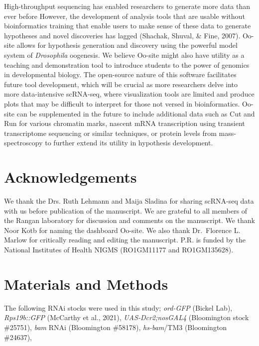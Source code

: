 \documentclass[12pt,oneside]{reedthesis}
\begin{document}
High-throughput sequencing has enabled researchers to generate more data
than ever before However, the development of analysis tools that are
usable without bioinformatics training that enable users to make sense
of these data to generate hypotheses and novel discoveries has lagged
(Shachak, Shuval, \& Fine, 2007). Oo-site allows for
hypothesis generation and discovery using the powerful model system of
\emph{Drosophila} oogenesis. We believe Oo-site might also have utility as a
teaching and demonstration tool to introduce students to the power of
genomics in developmental biology. The open-source nature of this
software facilitates future tool development, which will be crucial as
more researchers delve into more data-intensive scRNA-seq, where
visualization tools are limited and produce plots that may be difficult
to interpret for those not versed in bioinformatics. Oo-site can be
supplemented in the future to include additional data such as Cut and
Run for various chromatin marks, nascent mRNA transcription using
transient transcriptome sequencing or similar techniques, or protein
levels from mass-spectroscopy to further extend its utility in
hypothesis development.

\hypertarget{acknowledgements}{%
\section{Acknowledgements}\label{acknowledgements}}

We thank the Drs. Ruth Lehmann and Maija Sladina for sharing scRNA-seq
data with us before publication of the manuscript. We are grateful to
all members of the Rangan laboratory for discussion and comments on the
manuscript. We thank Noor Kotb for naming the dashboard Oo-site. We also
thank Dr.~Florence L. Marlow for critically reading and editing the
manuscript. P.R. is funded by the National Institutes of Health NIGMS
(RO1GM11177 and RO1GM135628).

\hypertarget{materials-and-methods-1}{%
\section{Materials and Methods}\label{materials-and-methods-1}}

The following RNAi stocks were used in this study; \emph{ord-GFP} (Bickel
Lab), \emph{Rps19b::GFP} (McCarthy et al., 2021),
\emph{UAS-Dcr2;nosGAL4} (Bloomington stock \#25751), \emph{bam} RNAi (Bloomington
\#58178), \emph{hs-bam}/TM3 (Bloomington \#24637),
\end{document}
